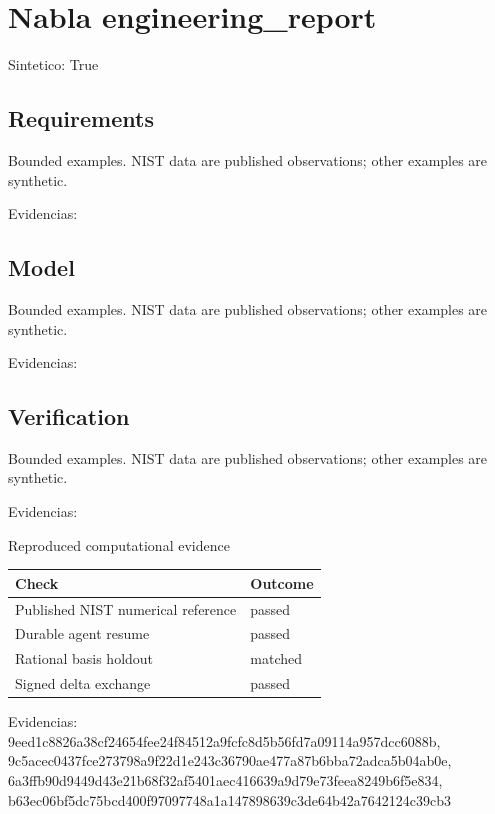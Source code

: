 \documentclass{article}
\begin{document}
\section*{Nabla engineering\_report}
Sintetico: True\par
\subsection*{Requirements}
Bounded examples. NIST data are published observations; other examples are synthetic.\par
Evidencias: \par
\subsection*{Model}
Bounded examples. NIST data are published observations; other examples are synthetic.\par
Evidencias: \par
\subsection*{Verification}
Bounded examples. NIST data are published observations; other examples are synthetic.\par
Evidencias: \par
\begin{center}
Reproduced computational evidence\par
\begin{tabular}{ll}
Check & Outcome\\ \hline
Published NIST numerical reference & passed\\
Durable agent resume & passed\\
Rational basis holdout & matched\\
Signed delta exchange & passed\\
\end{tabular}
\par Evidencias: 9eed1c8826a38cf24654fee2\allowbreak{}4f84512a9fcfc8d5b56fd7a0\allowbreak{}9114a957dcc6088b, 9c5acec0437fce273798a9f2\allowbreak{}2d1e243c36790ae477a87b6b\allowbreak{}ba72adca5b04ab0e, 6a3ffb90d9449d43e21b68f3\allowbreak{}2af5401aec416639a9d79e73\allowbreak{}feea8249b6f5e834, b63ec06bf5dc75bcd400f970\allowbreak{}97748a1a147898639c3de64b\allowbreak{}42a7642124c39cb3
\end{center}
\end{document}
